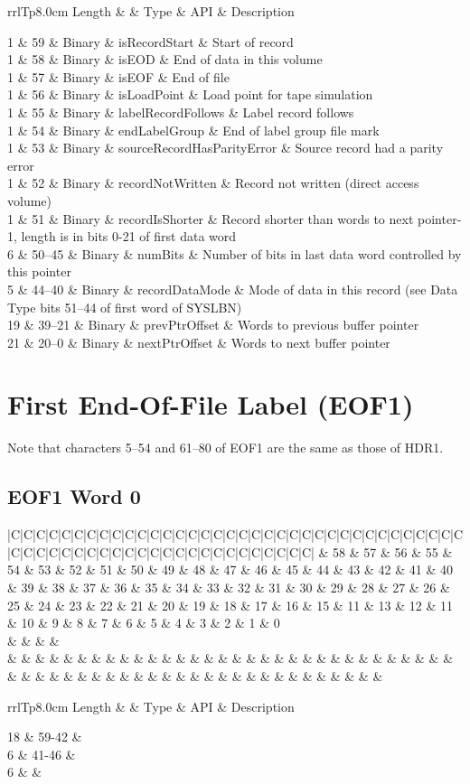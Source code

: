\documentclass{report}
\newcommand{\controlword}[1]{
{\scriptsize
\setlength{\tabcolsep}{0.7pt}
\begin{center}
\begin{tabular}{|C|C|C|C|C|C|C|C|C|C|C|C|C|C|C|C|C|C|C|C|C|C|C|C|C|C|C|C|C|C|C|C|C|C|C|C|C|C|C|C|C|C|C|C|C|C|C|C|C|C|C|C|C|C|C|C|C|C|C|C|}
\hline
59 & 58 & 57 & 56 & 55 & 54 & 53 & 52 & 51 & 50 &
49 & 48 & 47 & 46 & 45 & 44 & 43 & 42 & 41 & 40 &
39 & 38 & 37 & 36 & 35 & 34 & 33 & 32 & 31 & 30 &
29 & 28 & 27 & 26 & 25 & 24 & 23 & 22 & 21 & 20 &
19 & 18 & 17 & 16 & 15 & 11 & 13 & 12 & 11 & 10 &
 9 &  8 &  7 &  6 &  5 &  4 &  3 &  2 &  1 &  0 \\
#1 \\
& & & & & & & & & & & & & & & & & & & & & & & & & & & & & & & & & & & & & & & & & & & & & & & & & & & & & & & & & & & \\
\hline
\end{tabular}
\end{center}}
}
\newcommand{\controlworddesc}[1]{
\begin{center}
\begin{tabular}[t]{rrlTp{8.0cm}}
Length & \multicolumn{1}{l}{Bits} & Type & API & Description \\
\midrule
#1
\end{tabular}
\end{center}
}
\begin{document}
\controlworddesc{
 1 &     59 & Binary & isRecordStart              & Start of record \\
 1 &     58 & Binary & isEOD                      & End of data in this volume \\
 1 &     57 & Binary & isEOF                      & End of file \\
 1 &     56 & Binary & isLoadPoint                & Load point for tape simulation \\
 1 &     55 & Binary & labelRecordFollows         & Label record follows \\
 1 &     54 & Binary & endLabelGroup              & End of label group file mark \\
 1 &     53 & Binary & sourceRecordHasParityError & Source record had a parity error \\
 1 &     52 & Binary & recordNotWritten           & Record not written (direct access volume) \\
 1 &     51 & Binary & recordIsShorter            & Record shorter than words to next pointer-1, length is in bits 0-21 of first data word \\
 6 & 50--45 & Binary & numBits                    & Number of bits in last data word controlled by this pointer \\
 5 & 44--40 & Binary & recordDataMode             & Mode of data in this record (see Data Type bits 51--44 of first word of SYSLBN) \\
19 & 39--21 & Binary & prevPtrOffset              & Words to previous buffer pointer \\
21 & 20--0  & Binary & nextPtrOffset              & Words to next buffer pointer \\
}



\section{First End-Of-File Label (EOF1)}

Note that characters 5--54 and 61--80 of EOF1 are the same as those of HDR1.

\subsection{EOF1 Word 0}

\controlword{
 &
 &
\multicolumn{6}{c|}{F} &
\multicolumn{6}{c|}{1} &
}

\controlworddesc{
18 & 59-42 & \\
 6 & 41-46 & \\
 6 & & \\
}
\end{document}
